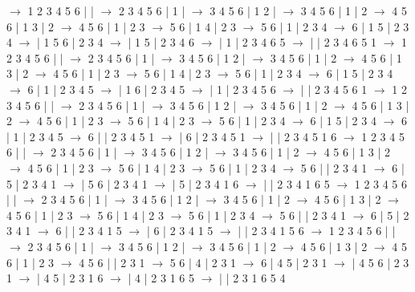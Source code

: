\documentclass{article}
\begin{document}
\newline
 $\rightarrow$ 1 2 3 4 5 6 |  |  $\rightarrow$ 2 3 4 5 6 | 1 |  $\rightarrow$ 3 4 5 6 | 1 2 |  $\rightarrow$ 3 4 5 6 | 1 | 2 $\rightarrow$ 4 5 6 | 1 3 | 2 $\rightarrow$ 4 5 6 | 1 | 2 3 $\rightarrow$ 5 6 | 1 4 | 2 3 $\rightarrow$ 5 6 | 1 | 2 3 4 $\rightarrow$ 6 | 1 5 | 2 3 4 $\rightarrow$  | 1 5 6 | 2 3 4 $\rightarrow$  | 1 5 | 2 3 4 6 $\rightarrow$  | 1 | 2 3 4 6 5 $\rightarrow$  |  | 2 3 4 6 5 1
\newline
 $\rightarrow$ 1 2 3 4 5 6 |  |  $\rightarrow$ 2 3 4 5 6 | 1 |  $\rightarrow$ 3 4 5 6 | 1 2 |  $\rightarrow$ 3 4 5 6 | 1 | 2 $\rightarrow$ 4 5 6 | 1 3 | 2 $\rightarrow$ 4 5 6 | 1 | 2 3 $\rightarrow$ 5 6 | 1 4 | 2 3 $\rightarrow$ 5 6 | 1 | 2 3 4 $\rightarrow$ 6 | 1 5 | 2 3 4 $\rightarrow$ 6 | 1 | 2 3 4 5 $\rightarrow$  | 1 6 | 2 3 4 5 $\rightarrow$  | 1 | 2 3 4 5 6 $\rightarrow$  |  | 2 3 4 5 6 1
\newline
 $\rightarrow$ 1 2 3 4 5 6 |  |  $\rightarrow$ 2 3 4 5 6 | 1 |  $\rightarrow$ 3 4 5 6 | 1 2 |  $\rightarrow$ 3 4 5 6 | 1 | 2 $\rightarrow$ 4 5 6 | 1 3 | 2 $\rightarrow$ 4 5 6 | 1 | 2 3 $\rightarrow$ 5 6 | 1 4 | 2 3 $\rightarrow$ 5 6 | 1 | 2 3 4 $\rightarrow$ 6 | 1 5 | 2 3 4 $\rightarrow$ 6 | 1 | 2 3 4 5 $\rightarrow$ 6 |  | 2 3 4 5 1 $\rightarrow$  | 6 | 2 3 4 5 1 $\rightarrow$  |  | 2 3 4 5 1 6
\newline
 $\rightarrow$ 1 2 3 4 5 6 |  |  $\rightarrow$ 2 3 4 5 6 | 1 |  $\rightarrow$ 3 4 5 6 | 1 2 |  $\rightarrow$ 3 4 5 6 | 1 | 2 $\rightarrow$ 4 5 6 | 1 3 | 2 $\rightarrow$ 4 5 6 | 1 | 2 3 $\rightarrow$ 5 6 | 1 4 | 2 3 $\rightarrow$ 5 6 | 1 | 2 3 4 $\rightarrow$ 5 6 |  | 2 3 4 1 $\rightarrow$ 6 | 5 | 2 3 4 1 $\rightarrow$  | 5 6 | 2 3 4 1 $\rightarrow$  | 5 | 2 3 4 1 6 $\rightarrow$  |  | 2 3 4 1 6 5
\newline
 $\rightarrow$ 1 2 3 4 5 6 |  |  $\rightarrow$ 2 3 4 5 6 | 1 |  $\rightarrow$ 3 4 5 6 | 1 2 |  $\rightarrow$ 3 4 5 6 | 1 | 2 $\rightarrow$ 4 5 6 | 1 3 | 2 $\rightarrow$ 4 5 6 | 1 | 2 3 $\rightarrow$ 5 6 | 1 4 | 2 3 $\rightarrow$ 5 6 | 1 | 2 3 4 $\rightarrow$ 5 6 |  | 2 3 4 1 $\rightarrow$ 6 | 5 | 2 3 4 1 $\rightarrow$ 6 |  | 2 3 4 1 5 $\rightarrow$  | 6 | 2 3 4 1 5 $\rightarrow$  |  | 2 3 4 1 5 6
\newline
 $\rightarrow$ 1 2 3 4 5 6 |  |  $\rightarrow$ 2 3 4 5 6 | 1 |  $\rightarrow$ 3 4 5 6 | 1 2 |  $\rightarrow$ 3 4 5 6 | 1 | 2 $\rightarrow$ 4 5 6 | 1 3 | 2 $\rightarrow$ 4 5 6 | 1 | 2 3 $\rightarrow$ 4 5 6 |  | 2 3 1 $\rightarrow$ 5 6 | 4 | 2 3 1 $\rightarrow$ 6 | 4 5 | 2 3 1 $\rightarrow$  | 4 5 6 | 2 3 1 $\rightarrow$  | 4 5 | 2 3 1 6 $\rightarrow$  | 4 | 2 3 1 6 5 $\rightarrow$  |  | 2 3 1 6 5 4
\end{document}
